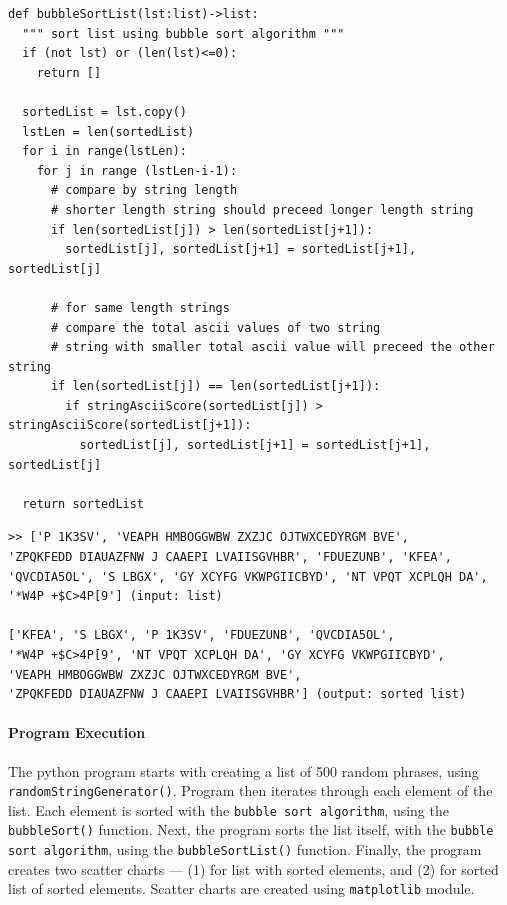 \documentclass[UTF8, letter]{article}
\begin{document}
\begin{codeblock}
\begin{verbatim}
def bubbleSortList(lst:list)->list:
  """ sort list using bubble sort algorithm """
  if (not lst) or (len(lst)<=0):
    return []

  sortedList = lst.copy()
  lstLen = len(sortedList)
  for i in range(lstLen):
    for j in range (lstLen-i-1):
      # compare by string length
      # shorter length string should preceed longer length string
      if len(sortedList[j]) > len(sortedList[j+1]):
        sortedList[j], sortedList[j+1] = sortedList[j+1], sortedList[j]
      
      # for same length strings
      # compare the total ascii values of two string
      # string with smaller total ascii value will preceed the other string
      if len(sortedList[j]) == len(sortedList[j+1]):  
        if stringAsciiScore(sortedList[j]) > stringAsciiScore(sortedList[j+1]):
          sortedList[j], sortedList[j+1] = sortedList[j+1], sortedList[j]

  return sortedList
\end{verbatim}
\end{codeblock}

\vspace{5mm}
\begin{codeblock}[frametitle=Output --- Sorting (List):]
\begin{verbatim}
>> ['P 1K3SV', 'VEAPH HMBOGGWBW ZXZJC OJTWXCEDYRGM BVE', 
'ZPQKFEDD DIAUAZFNW J CAAEPI LVAIISGVHBR', 'FDUEZUNB', 'KFEA', 
'QVCDIA5OL', 'S LBGX', 'GY XCYFG VKWPGIICBYD', 'NT VPQT XCPLQH DA', 
'*W4P +$C>4P[9'] (input: list)

['KFEA', 'S LBGX', 'P 1K3SV', 'FDUEZUNB', 'QVCDIA5OL', 
'*W4P +$C>4P[9', 'NT VPQT XCPLQH DA', 'GY XCYFG VKWPGIICBYD', 
'VEAPH HMBOGGWBW ZXZJC OJTWXCEDYRGM BVE', 
'ZPQKFEDD DIAUAZFNW J CAAEPI LVAIISGVHBR'] (output: sorted list)
\end{verbatim}
\end{codeblock}



\pagebreak
\paragraph{Program Execution}
The python program starts with creating a list of 500 random phrases, using \texttt{randomStringGenerator()}. Program then iterates through each element of the list. Each element is sorted with the \texttt{bubble sort algorithm}, using the \texttt{bubbleSort()} function. Next, the program sorts the list itself, with the \texttt{bubble sort algorithm}, using the \texttt{bubbleSortList()} function. Finally, the program creates two scatter charts --- (1) for list with sorted elements, and (2) for sorted list of sorted elements. Scatter charts are created using \texttt{matplotlib} module.
\end{document}
